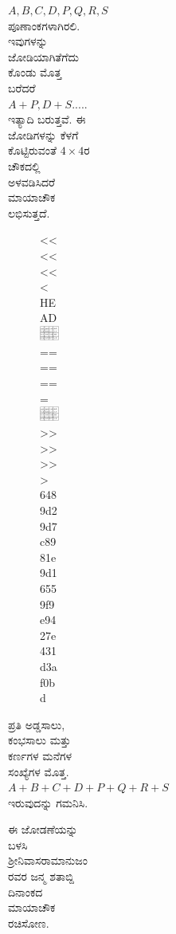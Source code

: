 \begin{figure}[H]
\begin{figure}[H]
\begin{figure}[h]
\begin{figure}[h]
\begin{figure}[h]
$A, B, C, D, P, Q, R, S$ ಪೂಣಾಂಕಗಳಾಗಿರಲಿ. ಇವುಗಳನ್ನು ಜೋಡಿಯಾಗಿ\break ತೆಗೆದುಕೊಂಡು ಮೊತ್ತ ಬರೆದರೆ $A+P, D+S.....$ ಇತ್ಯಾದಿ ಬರುತ್ತವೆ. ಈ ಜೋಡಿಗಳನ್ನು ಕೆಳಗೆ ಕೊಟ್ಟಿರುವಂತೆ $4 \times 4$ರ ಚೌಕದಲ್ಲಿ ಅಳವಡಿಸಿದರೆ ಮಾಯಾಚೌಕ ಲಭಿಸುತ್ತದೆ.
\begin{figure}[h]
<<<<<<< HEAD
\includegraphics{src/figures/chap3/fig3-44.jpg}
=======
\includegraphics[scale=.9]{src/figures/chap3/fig3.44.jpg}
>>>>>>> 6489d29d7c8981e9d16559f9e9427e431d3af0bd
\end{figure}

ಪ್ರತಿ ಅಡ್ಡಸಾಲು, ಕಂಭಸಾಲು ಮತ್ತು ಕರ್ಣಗಳ ಮನೆಗಳ ಸಂಖ್ಯೆಗಳ ಮೊತ್ತ. $A+B+C+ D+ P+ Q+ R+ S$ ಇರುವುದನ್ನು ಗಮನಿಸಿ.

ಈ ಜೋಡಣೆಯನ್ನು ಬಳಸಿ ಶ್ರೀನಿವಾಸರಾಮಾನುಜಂರವರ ಜನ್ಮ ಶತಾಬ್ದಿ ದಿನಾಂಕದ ಮಾಯಾಚೌಕ ರಚಿಸೋಣ.


\end{figure}
\end{figure}
\end{figure}
\end{figure}
\end{figure}
